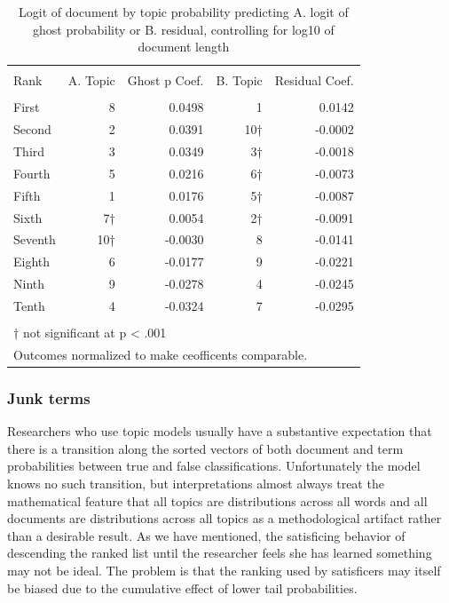 \documentclass[]{book}
\theoremstyle{definition}
\theoremstyle{definition}
\theoremstyle{definition}
\theoremstyle{remark}
\begin{document}
\begin{table}[!htbp] \centering 
  \caption{Logit of document by topic probability predicting A. logit of ghost probability or B. residual, controlling for log10 of document length} 
  \label{tab:Kghost} 
\begin{tabular}{@{\extracolsep{5pt}} lrrrr} 
\\[-1.8ex]\hline 
\hline \\[-1.8ex] 
Rank & A. Topic & Ghost p Coef. & B. Topic & Residual Coef. \\ 
\hline \\[-1.8ex] 
First & 8 &  0.0498 & 1 &  0.0142 \\ 
Second & 2 &  0.0391 & 10† & -0.0002 \\ 
Third & 3 &  0.0349 & 3† & -0.0018 \\ 
Fourth & 5 &  0.0216 & 6† & -0.0073 \\ 
Fifth & 1 &  0.0176 & 5† & -0.0087 \\ 
Sixth & 7† &  0.0054 & 2† & -0.0091 \\ 
Seventh & 10† & -0.0030 & 8 & -0.0141 \\ 
Eighth & 6 & -0.0177 & 9 & -0.0221 \\ 
Ninth & 9 & -0.0278 & 4 & -0.0245 \\ 
Tenth & 4 & -0.0324 & 7 & -0.0295 \\ 
\hline \\[-1.8ex] 
\multicolumn{5}{l}{† not significant at p < .001} \\ 
\multicolumn{5}{l}{Outcomes normalized to make ceofficents comparable.} \\ 
\end{tabular} 
\end{table}

\hypertarget{junk-terms}{%
\subsubsection{Junk terms}\label{junk-terms}}

Researchers who use topic models usually have a substantive expectation
that there is a transition along the sorted vectors of both document and
term probabilities between true and false classifications. Unfortunately
the model knows no such transition, but interpretations almost always
treat the mathematical feature that all topics are distributions across
all words and all documents are distributions across all topics as a
methodological artifact rather than a desirable result. As we have
mentioned, the satisficing behavior of descending the ranked list until
the researcher feels she has learned something may not be ideal. The
problem is that the ranking used by satisficers may itself be biased due
to the cumulative effect of lower tail probabilities.
\end{document}
